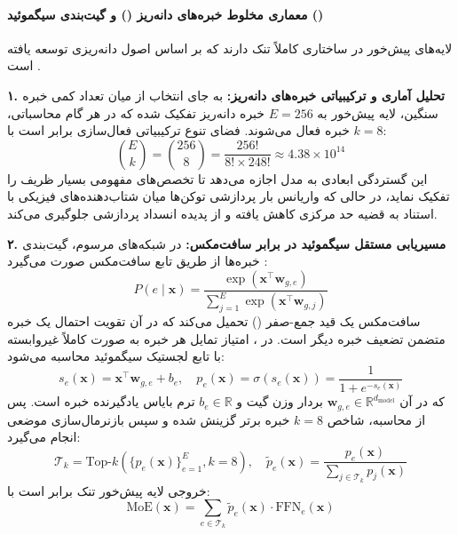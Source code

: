 \paragraph*{معماری مخلوط خبره‌های دانه‌ریز () و گیت‌بندی سیگموئید ()}
لایه‌های پیش‌خور در  ساختاری کاملاً تنک دارند که بر اساس اصول دانه‌ریزی توسعه یافته است \cite{dai2024deepseekmoe}.

\textbf{۱. تحلیل آماری و ترکیبیاتی خبره‌های دانه‌ریز:}
به جای انتخاب از میان تعداد کمی خبره سنگین، لایه پیش‌خور به $E = 256$ خبره دانه‌ریز تفکیک شده که در هر گام محاسباتی، $k = 8$ خبره فعال می‌شوند. فضای تنوع ترکیبیاتی فعال‌سازی برابر است با:
\begin{equation}
    \binom{E}{k} = \binom{256}{8} = \frac{256!}{8! \times 248!} \approx 4.38 \times 10^{14}
\end{equation}
این گستردگی ابعادی به مدل اجازه می‌دهد تا تخصص‌های مفهومی بسیار ظریف را تفکیک نماید، در حالی که واریانس بار پردازشی توکن‌ها میان شتاب‌دهنده‌های فیزیکی با استناد به قضیه حد مرکزی کاهش یافته و از پدیده انسداد پردازشی جلوگیری می‌کند.

\textbf{۲. مسیریابی مستقل سیگموئید در برابر سافت‌مکس:}
در شبکه‌های مرسوم، گیت‌بندی خبره‌ها از طریق تابع سافت‌مکس صورت می‌گیرد \cite{shazeer2017moe}:
\begin{equation}
    P(e \mid \mathbf{x}) = \frac{\exp(\mathbf{x}^\top \mathbf{w}_{g, e})}{\sum_{j=1}^E \exp(\mathbf{x}^\top \mathbf{w}_{g, j})}
\end{equation}
سافت‌مکس یک قید جمع-صفر () تحمیل می‌کند که در آن تقویت احتمال یک خبره متضمن تضعیف خبره دیگر است. در ، امتیاز تمایل هر خبره به صورت کاملاً غیروابسته با تابع لجستیک سیگموئید محاسبه می‌شود:
\begin{equation}
    s_e(\mathbf{x}) = \mathbf{x}^\top \mathbf{w}_{g, e} + b_e, \quad p_e(\mathbf{x}) = \sigma(s_e(\mathbf{x})) = \frac{1}{1 + e^{-s_e(\mathbf{x})}}
\end{equation}
که در آن $\mathbf{w}_{g, e} \in \mathbb{R}^{d_{\text{model}}}$ بردار وزن گیت و $b_e \in \mathbb{R}$ ترم بایاس یادگیرنده خبره است. پس از محاسبه، شاخص $k=8$ خبره برتر گزینش شده و سپس بازنرمال‌سازی موضعی انجام می‌گیرد:
\begin{equation}
    \mathcal{T}_k = \text{Top-}k\left(\{p_e(\mathbf{x})\}_{e=1}^E, k=8\right), \quad \tilde{p}_e(\mathbf{x}) = \frac{p_e(\mathbf{x})}{\sum_{j \in \mathcal{T}_k} p_j(\mathbf{x})}
\end{equation}
خروجی لایه پیش‌خور تنک برابر است با:
\begin{equation}
    \text{MoE}(\mathbf{x}) = \sum_{e \in \mathcal{T}_k} \tilde{p}_e(\mathbf{x}) \cdot \text{FFN}_e(\mathbf{x})
\end{equation}

